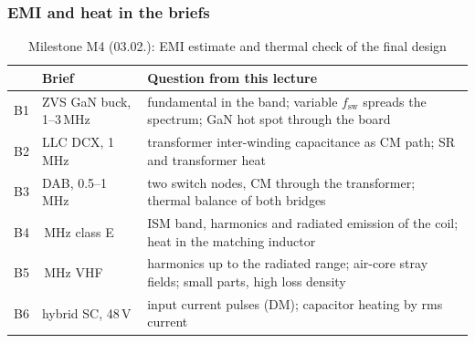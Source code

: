 \begin{frame}
	\frametitle{EMI and heat in the briefs}
	\begin{table}
		\centering
		\footnotesize
		\begin{tabular}{|l|>{\raggedright\arraybackslash}p{3.0cm}|>{\raggedright\arraybackslash}p{9.6cm}|}
			\hline
			   & \textbf{Brief}           & \textbf{Question from this lecture}                                                                              \\
			\hline
			B1 & ZVS GaN buck, 1--3\,MHz  & fundamental in the band; variable $f_\mathrm{sw}$ spreads the spectrum; GaN hot spot through the board           \\
			B2 & LLC DCX, 1\,MHz          & transformer inter-winding capacitance as CM path; SR and transformer heat                                         \\
			B3 & DAB, 0.5--1\,MHz         & two switch nodes, CM through the transformer; thermal balance of both bridges                                     \\
			B4 & 6.78\,MHz class E        & ISM band, harmonics and radiated emission of the coil; heat in the matching inductor                              \\
			B5 & 13.56\,MHz VHF           & harmonics up to the radiated range; air-core stray fields; small parts, high loss density                         \\
			B6 & hybrid SC, 48\,V         & input current pulses (DM); capacitor heating by rms current                                                        \\
			\hline
		\end{tabular}
		\caption{Milestone M4 (03.02.): EMI estimate and thermal check of the final design}
	\end{table}
\end{frame}

